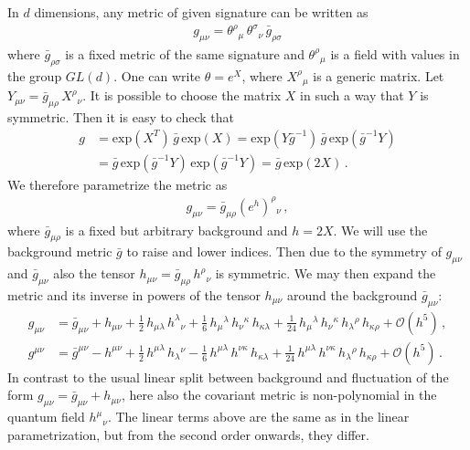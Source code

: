 \documentclass[11pt]{book}
\numberwithin{equation}{chapter}
\begin{document}
\begin{appendices}
In $d$ dimensions, any metric of given signature can be written as
\begin{align}
  g_{\mu\nu} = \theta^\rho{}_\mu \, \theta^\sigma{}_\nu  \, \bar g_{\rho\sigma}
\end{align}
where $\bar g_{\rho \sigma}$ is a fixed metric of the same signature
and $\theta^\rho{}_\mu$ is a field with values in the group $GL(d)$.
One can write $\theta=e^X$, where $X^\rho{}_\mu$ is a generic matrix.
Let $Y_{\mu\nu} = \bar g_{\mu\rho} \, X^\rho{}_\nu$.
It is possible to choose the matrix $X$ in such a way that $Y$ is symmetric.
Then it is easy to check that
\begin{align}
  g &= \mathrm{exp}( X^T ) \, \bar g \, \mathrm{exp}(X)
    = \mathrm{exp}(Y \bar{g}^{-1}) \, \bar g \, \mathrm{exp}(\bar g^{-1}Y) \nonumber \\
    &= \bar g \, \mathrm{exp}(\bar g^{-1}Y) \, \mathrm{exp}(\bar g^{-1}Y)
    = \bar g \, \mathrm{exp}(2X) \,.
\end{align}
We therefore parametrize the metric as
\begin{align}
  \label{decomp}
  g_{\mu\nu} = \bar g_{\mu\rho} (e^h)^\rho{}_\nu \,,
\end{align}
where $\bar g_{\mu\rho}$ is a fixed but arbitrary background and $h=2X$.
We will use the background metric $\bar g$ to raise and lower indices.
Then due to the symmetry of $g_{\mu\nu}$ and $\bar g_{\mu\nu}$ also the tensor
$h_{\mu\nu}=\bar g_{\mu\rho} \, h^\rho{}_\nu$ is symmetric.
We may then expand the metric and its inverse in powers of the tensor
$h_{\mu\nu}$ around the background $\bar g_{\mu\nu}$:
\begin{align}
  g_{\mu\nu} &= \bar g_{\mu\nu}
  + h_{\mu\nu}
  + \frac{1}{2} \, h_{\mu\lambda} \, h^\lambda{}_\nu
  + \frac{1}{6} \, h_{\mu}{}^\lambda \, h_\nu{}^\kappa \, h_{\kappa\lambda}
  + \frac{1}{24} \, h_{\mu}{}^\lambda \, h_\nu{}^\kappa \, h_{\lambda}{}^\rho \, h_{\kappa\rho}
  + \mathcal O(h^5) \,, \\
  g^{\mu\nu} &= \bar g^{\mu\nu}
  - h^{\mu\nu}
  + \frac{1}{2} \, h^{\mu\lambda} \, h_\lambda{}^\nu
  - \frac{1}{6} \, h^{\mu\lambda} \, h^{\nu\kappa} \, h_{\kappa\lambda}
  + \frac{1}{24} \, h^{\mu\lambda} \, h^{\nu\kappa} \, h_{\lambda}{}^\rho \, h_{\kappa\rho}
  + \mathcal O(h^5) \,.
\end{align}
In contrast to the usual linear split between background and fluctuation of the form
$g_{\mu\nu} = \bar g_{\mu\nu} + h_{\mu\nu}$, here also the covariant metric is
non-polynomial in the quantum field $h^\mu{}_\nu$.
The linear terms above are the same as in the linear parametrization,
but from the second order onwards, they differ.



\end{appendices}
\end{document}
